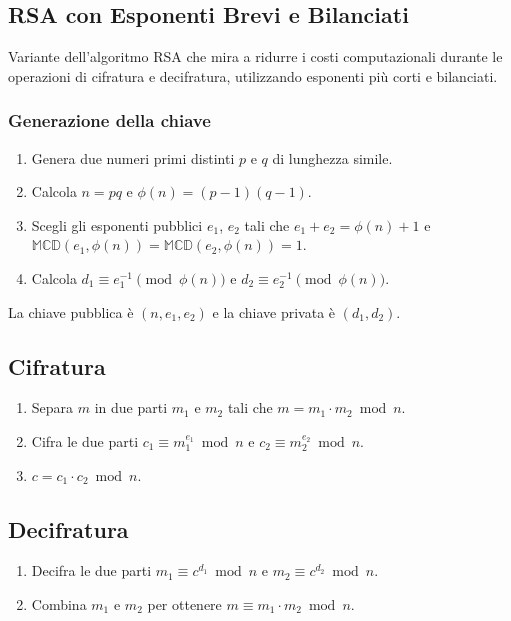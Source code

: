 \documentclass[a4paper,12pt]{report}
\begin{document}
\subsection{RSA con Esponenti Brevi e Bilanciati} \cite{10.1007/978-3-540-30580-4_14}
Variante dell'algoritmo RSA che mira a ridurre i costi computazionali durante le operazioni di cifratura e decifratura, utilizzando esponenti più corti e bilanciati.

\subsubsection*{Generazione della chiave}
\begin{enumerate}
    \item Genera due numeri primi distinti $p$ e $q$ di lunghezza simile.
    \item Calcola $n = pq$ e $\phi(n) = (p-1)(q-1)$.
    \item Scegli gli esponenti pubblici $e_1$, $e_2$ tali che $e_1 + e_2 = \phi(n) + 1$ e $\mathbb{MCD}(e_1, \phi(n)) = \mathbb{MCD}(e_2, \phi(n)) = 1$.
    \item Calcola $d_1 \equiv e_1^{-1} \pmod{\phi(n)}$ e $d_2 \equiv e_2^{-1} \pmod{\phi(n)}$.
\end{enumerate}
La chiave pubblica è $(n, e_1, e_2)$ e la chiave privata è $(d_1, d_2)$.

\subsection{Cifratura}
\begin{enumerate}
    \item Separa $m$ in due parti $m_1$ e $m_2$ tali che $m = m_1 \cdot m_2 \bmod n$.
    \item Cifra le due parti $c_1 \equiv m_1^{e_1} \bmod n$ e $c_2 \equiv m_2^{e_2} \bmod n$.
    \item $c = c_1 \cdot c_2 \bmod n$.
\end{enumerate}

\subsection{Decifratura}
\begin{enumerate}
    \item Decifra le due parti $m_1 \equiv c^{d_1} \bmod n$ e $m_2 \equiv c^{d_2} \bmod n$.
    \item Combina $m_1$ e $m_2$ per ottenere $m \equiv m_1 \cdot m_2 \bmod n$.
\end{enumerate}
\end{document}
